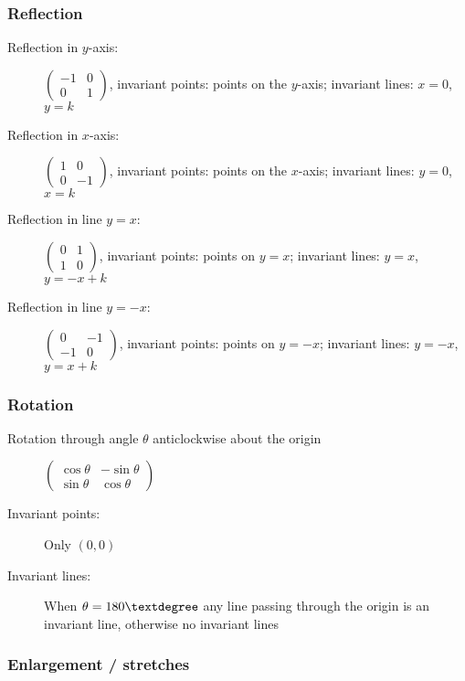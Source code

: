 \subsubsection{Reflection}
\begin{description}
	\item[Reflection in $y$-axis:] $\begin{pmatrix}
		-1&0\\0&1
	\end{pmatrix}$, invariant points: points on the $y$-axis; invariant lines: $x=0$, $y=k$
	\item[Reflection in $x$-axis:] $\begin{pmatrix}
		1&0\\0&-1
	\end{pmatrix}$, invariant points: points on the $x$-axis; invariant lines: $y=0$, $x=k$
	\item[Reflection in line $y=x$:] $\begin{pmatrix}
		0&1\\1&0
	\end{pmatrix}$, invariant points: points on $y=x$; invariant lines: $y=x$, $y=-x+k$
	\item[Reflection in line $y=-x$:] $\begin{pmatrix}
		0&-1\\-1&0
	\end{pmatrix}$, invariant points: points on $y=-x$; invariant lines: $y=-x$, $y=x+k$
\end{description}

\subsubsection{Rotation}
\begin{description}
	\item[Rotation through angle $\theta$ anticlockwise about the origin] $\begin{pmatrix}
		\cos\theta&-\sin\theta\\\sin\theta&\cos\theta
	\end{pmatrix}$
	\item[Invariant points:] Only $(0,0)$
	\item[Invariant lines:] When $\theta=180\textdegree$ any line passing through the origin is an invariant line, otherwise no invariant lines
\end{description}

\subsubsection{Enlargement / stretches}




